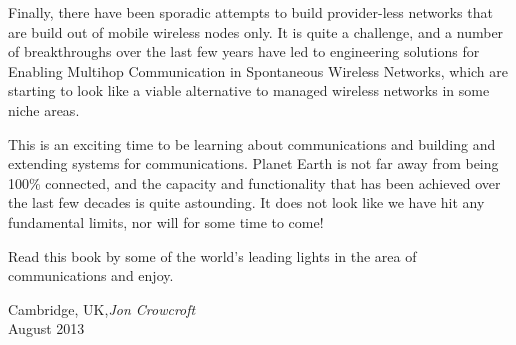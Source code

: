 Finally, there have been sporadic attempts to build provider-less
networks that are build out of mobile wireless nodes only. It is quite
a challenge, and a number of breakthroughs over the last few years have
led to engineering solutions for Enabling Multihop Communication in
Spontaneous Wireless Networks, which are starting to look like a
viable alternative to managed wireless networks in some niche areas.

This is an exciting time to be learning about communications and
building and extending systems for communications. Planet Earth is not
far away from being 100\% connected, and the capacity and functionality
that has been achieved over the last few decades is quite astounding.
It does not look like we have hit any fundamental limits, nor
will for some time to come!

Read this book by some of the world's leading lights in the area 
of communications and enjoy.

\vspace{\baselineskip}
\begin{flushright}\noindent
Cambridge, UK,\hfill {\it Jon Crowcroft}\\
August 2013
\end{flushright}
